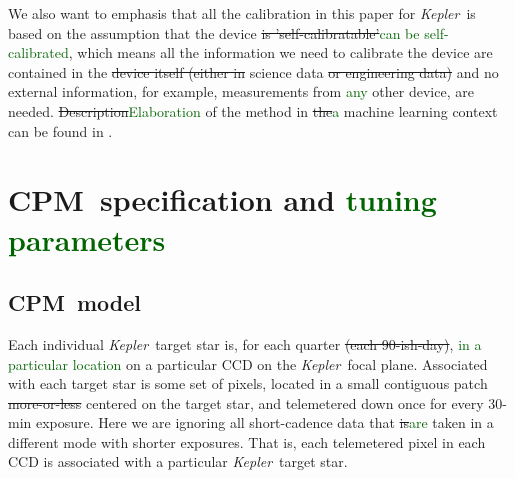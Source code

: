 \documentclass[12pt, preprint]{aastex}
\newcommand{\project}[1]{\textsl{#1}}
\newcommand{\Kepler}{\project{Kepler}}
\newcommand{\name}{CPM}
\newcommand{\revise}[1]{\textcolor{darkgreen}{#1}}
\newcommand{\remove}[1]{\sout{#1}}
\begin{document}
We also want to emphasis that all the calibration in this paper for \Kepler\ is 
  based on the assumption that the device \remove{is 'self-calibratable'}\revise{can be self-calibrated}, 
  which means all the information we need to calibrate the device are contained in the \remove{device itself 
  (either in} science data \remove{or engineering data)} and no external information, 
  for example, measurements from \revise{any} other device, are needed.
\remove{Description}\revise{Elaboration} of the method in \remove{the}\revise{a} machine learning context can be found in \citealt{icml2015}.

\section{\name\ specification and \revise{tuning parameters}}
\subsection{\name\ model}
Each individual \Kepler\ target star is, for each quarter \remove{(each 90-ish-day)},
  \revise{in a particular location} on a particular CCD on the \Kepler\ focal plane.
Associated with each target star is some set of pixels,
  located in a small contiguous patch \remove{more-or-less} centered on the target star,
  and telemetered down once for every 30-min exposure.
Here we are ignoring all short-cadence data that \remove{is}\revise{are} taken in a different mode with shorter exposures.
That is, each telemetered pixel in each CCD is associated with a particular \Kepler\ target star.
\end{document}
